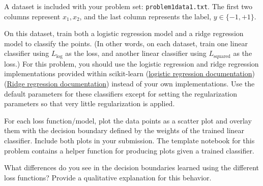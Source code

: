 \problem[9]
A dataset is included with your problem set: \texttt{problem1data1.txt}. The first two columns represent $x_1, x_2$, and the last column represents the label, $y \in \{-1,+1\}$.

On this dataset, train both a logistic regression model and a ridge regression model to classify the points.  (In other words, on each dataset, train one linear classifier using $L_\text{log}$ as the loss, and another linear classifier using $L_\text{squared}$ as the loss.) For this problem, you should use the logistic regression and ridge regression implementations provided within scikit-learn 
(\href{http://scikit-learn.org/stable/modules/generated/sklearn.linear_model.LogisticRegression.html}{logistic regression documentation})
(\href{http://scikit-learn.org/stable/modules/generated/sklearn.linear_model.Ridge.html}{Ridge regression documentation})
instead of your own implementations. Use the default parameters for these classifiers except for setting the regularization parameters so that very little regularization is applied.

For each loss function/model, plot the data points as a scatter plot and overlay them with the decision boundary defined by the weights of the trained linear classifier.  Include both plots in your submission. The template notebook for this problem contains a helper function for producing plots given a trained classifier.

What differences do you see in the decision boundaries learned using the different loss functions? Provide a qualitative explanation for this behavior.

